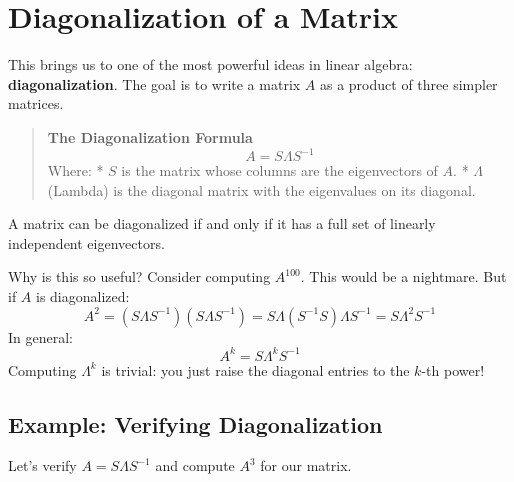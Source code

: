 \documentclass[
  letterpaper,
  DIV=11,
  numbers=noendperiod]{scrreprt}
\begin{document}
\section{Diagonalization of a Matrix}\label{diagonalization-of-a-matrix}

This brings us to one of the most powerful ideas in linear algebra:
\textbf{diagonalization}. The goal is to write a matrix \(A\) as a
product of three simpler matrices.

\begin{quote}
\textbf{The Diagonalization Formula} \[ A = S \Lambda S^{-1} \] Where: *
\(S\) is the matrix whose columns are the eigenvectors of \(A\). *
\(\Lambda\) (Lambda) is the diagonal matrix with the eigenvalues on its
diagonal.
\end{quote}

A matrix can be diagonalized if and only if it has a full set of
linearly independent eigenvectors.

Why is this so useful? Consider computing \(A^{100}\). This would be a
nightmare. But if \(A\) is diagonalized:
\[ A^2 = (S \Lambda S^{-1})(S \Lambda S^{-1}) = S \Lambda (S^{-1}S) \Lambda S^{-1} = S \Lambda^2 S^{-1} \]
In general: \[ A^k = S \Lambda^k S^{-1} \] Computing \(\Lambda^k\) is
trivial: you just raise the diagonal entries to the \(k\)-th power!

\subsection{Example: Verifying
Diagonalization}\label{example-verifying-diagonalization}

Let's verify \(A = S \Lambda S^{-1}\) and compute \(A^3\) for our
matrix.
\end{document}
